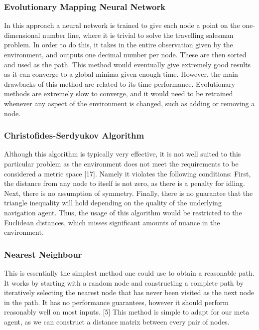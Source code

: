 \documentclass{article}
\begin{document}
	\subsubsection{Evolutionary Mapping Neural Network}
	\label{evol_nn}
	In this approach a neural network is trained to give each node a point on the one-dimensional number line, where it is trivial to solve the travelling salesman problem. In order to do this, it takes in the entire observation given by the environment, and outputs one decimal number per node. These are then sorted and used as the path. This method would eventually give extremely good results as it can converge to a global minima given enough time. However, the main drawbacks of this method are related to its time performance. Evolutionary methods are extremely slow to converge, and it would need to be retrained whenever any aspect of the environment is changed, such as adding or removing a node.
	
	\subsubsection{Christofides-Serdyukov Algorithm}
	Although this algorithm is typically very effective, it is not well suited to this particular problem as the environment does not meet the requirements to be considered a metric space [17]. Namely it violates the following conditions: First, the distance from any node to itself is not zero, as there is a penalty for idling. Next, there is no assumption of symmetry. Finally, there is no guarantee that the triangle inequality will hold depending on the quality of the underlying navigation agent. Thus, the usage of this algorithm would be restricted to the Euclidean distances, which misses significant amounts of nuance in the environment.
	
	\subsubsection{Nearest Neighbour}
	\label{nearest_neighbour}
	This is essentially the simplest method one could use to obtain a reasonable path. It works by starting with a random node and constructing a complete path by iteratively selecting the nearest node that has never been visited as the next node in the path. It has no performance guarantees, however it should perform reasonably well on most inputs. [5] This method is simple to adapt for our meta agent, as we can construct a distance matrix between every pair of nodes.
	
\end{document}

